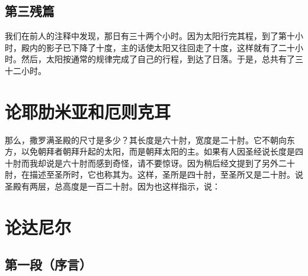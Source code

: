 \subsection{第三残篇}

我们在前人的注释中发现，那日有三十两个小时。因为太阳行完其程，到了第十小时，殿内的影子已下降了十度，主的话使太阳又往回走了十度，这样就有了二十小时。然后，太阳按通常的规律完成了自己的行程，到达了日落。于是，总共有了三十二小时。\par


\section{论耶肋米亚和厄则克耳}

那么，撒罗满圣殿的尺寸是多少？其长度是六十肘，宽度是二十肘。它不朝向东方，以免朝拜者朝拜升起的太阳，而是朝拜太阳的主。如果有人因圣经说长度是四十肘而我却说是六十肘而感到奇怪，请不要惊讶。因为稍后经文提到了另外二十肘，在描述至圣所时，它也称其为。这样，圣所是四十肘，至圣所又是二十肘。说圣殿有两层，总高度是一百二十肘。因为也这样指示，说：\par


\section{论达尼尔}


\subsection{第一段（序言）}


